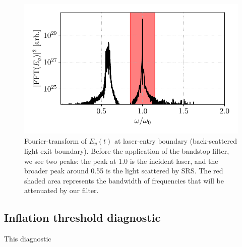 \begin{figure}[ht]
   \centering
    \includegraphics[width=0.8\columnwidth]{Chapters/C3_Methods/EyFFT1D_filter_bandwidth.pdf}
    \caption{Fourier-transform of $E_y(t)$ at laser-entry boundary (back-scattered light exit boundary). Before the application of the bandstop filter, we see two peaks: the peak at 1.0 is the incident laser, and the broader peak around 0.55 is the light scattered by SRS. The red shaded area represents the bandwidth of frequencies that will be attenuated by our filter.}
    \label{fig:bandstop}
\end{figure}{}

\subsection{Inflation threshold diagnostic}\label{diag:threshold}

This diagnostic 

